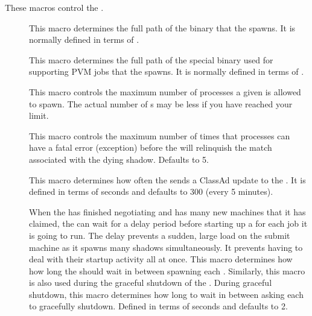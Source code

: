 These macros control the .
\begin{description}

\item[] \label{param:Shadow} This macro determines the
  full path of the  binary that the 
  spawns.  It is normally defined in terms of . 
  
\item[] \label{param:ShadowPvm} This macro
  determines the full path of the special  binary
  used for supporting PVM jobs that the  spawns.  It is
  normally defined in terms of .

\item[] \label{param:MaxJobsRunning} This
  macro controls the maximum number of  processes
  a given  is allowed to spawn.  The actual
  number of s may be less if you have reached
  your  limit.

\item[]
  \label{param:MaxShadowExceptions} This macro controls the maximum
  number of times that  processes can have a fatal
  error (exception) before the  will relinquish
  the match associated with the dying shadow.  Defaults to 5.

\item[] \label{param:ScheddInterval}  This
  macro determines how often the  sends a ClassAd
  update to the .  It is defined in terms of seconds
  and defaults to 300 (every 5 minutes).
  
\item[] \label{param:JobStartDelay} When the
   has finished negotiating and has many new
  machines that it has claimed, the  can wait
  for a delay period before starting up a  for each job
  it is going to run.  The delay prevents a sudden, large load on the submit
  machine as it spawns many shadows simultaneously. It prevents
  having to deal
  with their startup activity all at once.  This macro determines how
  how long the  should wait in between spawning each
  .  
  Similarly, this macro is also used during the graceful shutdown of the
  .
  During graceful shutdown, this macro determines how long to wait in
  between asking each  to gracefully shutdown.  
  Defined in terms of seconds and defaults to 2. 
  

\end{description}

